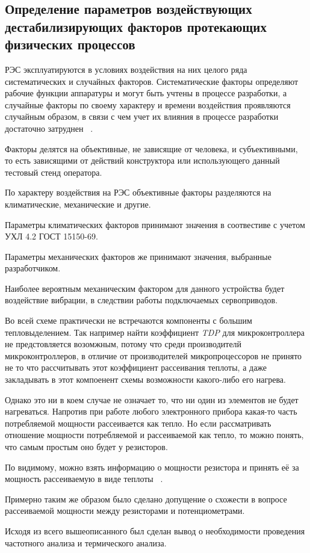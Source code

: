 \subsection{Определение параметров воздействующих дестабилизирующих факторов протекающих физических процессов}


РЭС эксплуатируются в условиях воздействия на них целого ряда
систематических и случайных факторов. Систематические факторы определяют рабочие функции аппаратуры и могут быть учтены в процессе разработки,
а случайные факторы по своему характеру и времени воздействия проявляются случайным образом, в связи с чем учет их влияния в процессе разработки достаточно затруднен ~\cite{Alexeev2013}.

Факторы делятся на объективные, не зависящие от человека, и субъективными, то есть зависящими от действий конструктора или использующего данный тестовый стенд оператора.

По характеру воздействия на РЭС объективные факторы разделяются на климатические, механические и другие.

Параметры климатических факторов принимают значения в соотвестиве с учетом УХЛ 4.2 ГОСТ 15150-69.

Параметры механических факторов же принимают значения, выбранные разработчиком.

Наиболее вероятным механическим фактором для данного устройства будет воздействие вибрации, в следствии работы подключаемых сервоприводов.

Во всей схеме практически не встречаются компоненты с большим тепловыделением. Так например найти коэффициент \textit{TDP} для микроконтроллера не предстовляется возомжным, потому что среди производителй микроконтроллеров, в отличие от производителей микропроцессоров не принято не то что рассчитывать этот коэффициент рассеивания теплоты, а даже закладывать в этот компоенент схемы возможности какого-либо его нагрева.

Однако это ни в коем случае не означает то, что ни один из элементов не будет нагреваться. Напротив при работе любого электронного прибора какая-то часть потребляемой мощности рассеивается как тепло.
Но если рассматривать отношение мощности потребляемой и рассеиваемой как тепло, то можно понять, что самым простым оно будет у резисторов.

По видимому, можно взять информацию о мощности резистора и принять её за мощность рассеиваемую в виде теплоты ~\cite{HeatDissipatedResistors}.

Примерно таким же образом было сделано допущение о схожести в вопросе рассеиваемой мощности между резисторами и потенциометрами.

Исходя из всего вышеописанного был сделан вывод о необходимости проведения частотного анализа и термического анализа.

\newpage